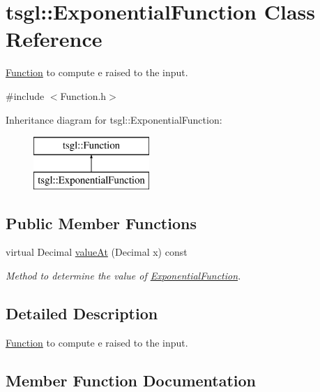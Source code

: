 \hypertarget{classtsgl_1_1_exponential_function}{}\section{tsgl\+:\+:Exponential\+Function Class Reference}
\label{classtsgl_1_1_exponential_function}


\hyperlink{classtsgl_1_1_function}{Function} to compute e raised to the input.  




{\ttfamily \#include $<$Function.\+h$>$}

Inheritance diagram for tsgl\+:\+:Exponential\+Function\+:\begin{figure}[H]
\begin{center}
\leavevmode
\includegraphics[height=2.000000cm]{classtsgl_1_1_exponential_function}
\end{center}
\end{figure}
\subsection*{Public Member Functions}
\begin{DoxyCompactItemize}
\item 
virtual Decimal \hyperlink{classtsgl_1_1_exponential_function_a65c7a08da7e5e0bdbf5dbcb13f046eb5}{value\+At} (Decimal x) const
\begin{DoxyCompactList}\small\item\em Method to determine the value of \hyperlink{classtsgl_1_1_exponential_function}{Exponential\+Function}. \end{DoxyCompactList}\end{DoxyCompactItemize}


\subsection{Detailed Description}
\hyperlink{classtsgl_1_1_function}{Function} to compute e raised to the input. 

\subsection{Member Function Documentation}
\mbox{\label{classtsgl_1_1_exponential_function_a65c7a08da7e5e0bdbf5dbcb13f046eb5}} 
